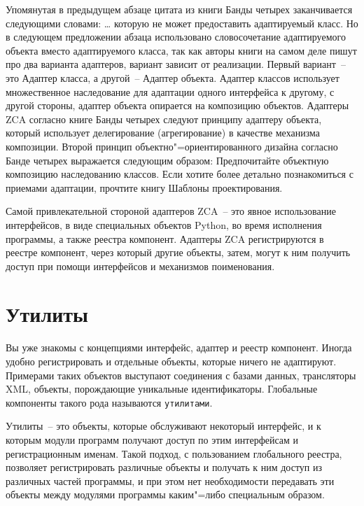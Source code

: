 \documentclass[a4paper,openany,twoside,final]{book}
\begin{document}
Упомянутая в предыдущем абзаце цитата из книги Банды четырех заканчивается следующими словами: \textquotedbl{} \ldots{} которую не может предоставить адаптируемый класс\textquotedbl{}.  Но в следующем предложении абзаца использовано словосочетание \textquotedbl{}адаптируемого объекта\textquotedbl{} вместо \textquotedbl{}адаптируемого класса\textquotedbl{}, так как авторы книги на самом деле пишут про два варианта адаптеров, вариант зависит от реализации.  Первый вариант~-- это \textquotedbl{}Адаптер класса\textquotedbl{}, а другой~-- \textquotedbl{}Адаптер объекта\textquotedbl{}.  Адаптер классов использует множественное наследование для адаптации одного интерфейса к другому, с другой стороны, адаптер объекта опирается на композицию объектов.  Адаптеры ZCA согласно книге Банды четырех следуют принципу адаптеру объекта, который использует делегирование (агрегирование) в качестве механизма композиции.  Второй принцип объектно"=ориентированного дизайна согласно Банде четырех выражается следующим образом: \textquotedbl{}Предпочитайте объектную композицию наследованию классов\textquotedbl{}.  Если хотите более детально познакомиться с приемами адаптации, прочтите книгу \textquotedbl{}Шаблоны проектирования\textquotedbl{}.

Самой привлекательной стороной адаптеров ZCA~-- это явное использование интерфейсов, в виде специальных объектов Python, во время исполнения программы, а также реестра компонент.  Адаптеры ZCA регистрируются в реестре компонент, через который другие объекты, затем, могут к ним получить доступ при помощи интерфейсов и механизмов поименования.


\chapter{Утилиты%
  \label{id39}%
}


Вы уже знакомы с концепциями \textquotedbl{}интерфейс\textquotedbl{}\textquotedbl{}, \textquotedbl{}адаптер\textquotedbl{} и \textquotedbl{}реестр компонент\textquotedbl{}.  Иногда удобно регистрировать и отдельные объекты, которые ничего не адаптируют.  Примерами таких объектов выступают соединения с базами данных, трансляторы XML, объекты, порождающие уникальные идентификаторы.  Глобальные компоненты такого рода называются \texttt{утилитами}.

Утилиты~-- это объекты, которые обслуживают некоторый интерфейс, и к которым модули программ получают доступ по этим интерфейсам и регистрационным именам.  Такой подход, с пользованием глобального реестра, позволяет регистрировать различные объекты и получать к ним доступ из различных частей программы, и при этом нет необходимости передавать эти объекты между модулями программы каким"=либо специальным образом.
\end{document}
